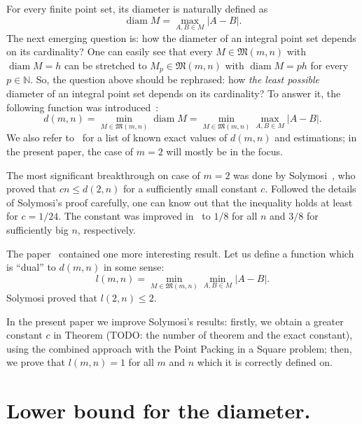 \documentclass[a4paper,14pt]{article} %
\theoremstyle{plain}
\begin{document}
For every finite point set, its diameter is naturally defined as
\begin{equation}
	\operatorname{diam} M = \max_{A,B\in M} |A-B|
	.
\end{equation}
The next emerging question is: how the diameter of an integral point set depends on its cardinality?
One can easily see that every $M\in\mathfrak{M}(m,n)$ with $\operatorname{diam} M = h$
can be stretched to $M_p\in\mathfrak{M}(m,n)$ with $\operatorname{diam} M = ph$
for every $p\in\mathbb{N}$.
So, the question above should be rephrased:
how \textit{the least possible} diameter of an integral point set depends on its cardinality?
To answer it, the following function was introduced~\cite{kurz2008bounds,kurz2008minimum}:
\begin{equation}
	d(m,n) = \min_{M\in\mathfrak{M}(m,n)} \operatorname{diam} M = \min_{M\in\mathfrak{M}(m,n)} \max_{A,B\in M} |A-B|
	.
\end{equation}
We also refer to~\cite{kurz2008bounds} for a list of known exact values of $d(m,n)$
and estimations; in the present paper, the case of $m=2$ will mostly be in the focus.

The most significant breakthrough on case of $m=2$ was done by Solymosi~\cite{solymosi2003note},
who proved that $cn \leq d(2,n)$ for a sufficiently small constant $c$.
Followed the details of Solymosi's proof carefully,
one can know out that the inequality holds at least for $c = 1/24$.
The constant was improved in~\cite{our-mz-rus,our-vmmsh-2018}
to $1/8$ for all $n$ and $3/8$ for sufficiently big $n$, respectively.

The paper~\cite{solymosi2003note} contained one more interesting result.
Let us define a function which is ``dual'' to $d(m,n)$ in some sense:
\begin{equation}
	l(m,n) = \min_{M\in\mathfrak{M}(m,n)} \min_{A,B\in M} |A-B|
	.
\end{equation}
Solymosi proved that $l(2,n)\leq 2$.

In the present paper we improve Solymosi's results:
firstly, we obtain a greater constant $c$ in Theorem (TODO: the number of theorem and the exact constant),
using the combined approach with the Point Packing in a Square problem;
then, we prove that $l(m,n)=1$ for all $m$ and $n$ which it is correctly defined on.


\section{Lower bound for the diameter.}
\end{document}
